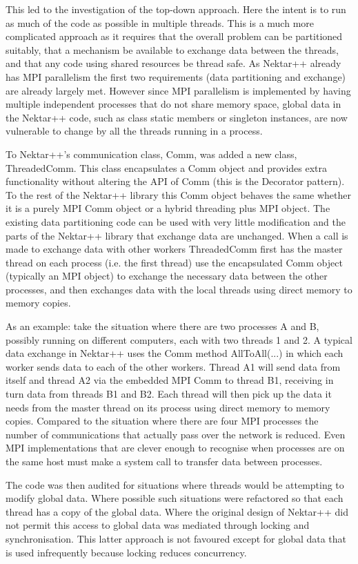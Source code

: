 This led to the investigation of the top-down approach.  Here the intent is to
run as much of the code as possible in multiple threads.  This is a much more
complicated approach as it requires that the overall problem can be partitioned
suitably, that a mechanism be available to exchange data between the threads,
and that any code using shared resources be thread safe.  As Nektar++ already
has MPI parallelism the first two requirements (data partitioning and exchange)
are already largely met.  However since MPI parallelism is implemented by having
multiple independent processes that do not share memory space, global data in
the Nektar++ code, such as class static members or singleton instances, are now
vulnerable to change by all the threads running in a process.

To Nektar++’s communication class, Comm, was added a new class, ThreadedComm. 
This class encapsulates a Comm object and provides extra functionality without
altering the API of Comm (this is the Decorator pattern).  To the rest of the
Nektar++ library this Comm object behaves the same whether it is a purely MPI
Comm object or a hybrid threading plus MPI object.  The existing data
partitioning code can be used with very little modification and the parts of the
Nektar++ library that exchange data are unchanged.  When a call is made to
exchange data with other workers ThreadedComm first has the master thread on
each process (i.e. the first thread) use the encapsulated Comm object (typically
an MPI object) to exchange the necessary data between the other processes, and
then exchanges data with the local threads using direct memory to memory copies.

As an example: take the situation where there are two processes A and B,
possibly running on different computers, each with two threads 1 and 2.  A
typical data exchange in Nektar++ uses the Comm method AllToAll(...) in which
each worker sends data to each of the other workers.  Thread A1 will send data
from itself and thread A2 via the embedded MPI Comm to thread B1, receiving in
turn data from threads B1 and B2.  Each thread will then pick up the data it
needs from the master thread on its process using direct memory to memory
copies.  Compared to the situation where there are four MPI processes the number
of communications that actually pass over the network is reduced.  Even MPI
implementations that are clever enough to recognise when processes are on the
same host must make a system call to transfer data between processes.

The code was then audited for situations where threads would be attempting to
modify global data.  Where possible such situations were refactored so that each
thread has a copy of the global data.  Where the original design of Nektar++ did
not permit this access to global data was mediated through locking and
synchronisation.  This latter approach is not favoured except for global data
that is used infrequently because locking reduces concurrency.

